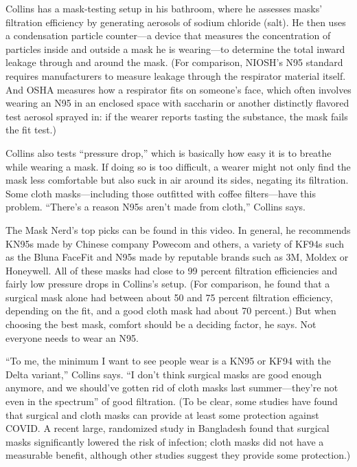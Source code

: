 \documentclass[a4paper, 14pt]{extarticle}
\begin{document}
Collins has a mask-testing setup in his bathroom, where he assesses masks’ filtration efficiency by generating aerosols of sodium chloride (salt). He then uses a condensation particle counter—a device that measures the concentration of particles inside and outside a mask he is wearing—to determine the total inward leakage through and around the mask. (For comparison, NIOSH’s N95 standard requires manufacturers to measure leakage through the respirator material itself. And OSHA measures how a respirator fits on someone’s face, which often involves wearing an N95 in an enclosed space with saccharin or another distinctly flavored test aerosol sprayed in: if the wearer reports tasting the substance, the mask fails the fit test.)

Collins also tests “pressure drop,” which is basically how easy it is to breathe while wearing a mask. If doing so is too difficult, a wearer might not only find the mask less comfortable but also suck in air around its sides, negating its filtration. Some cloth masks—including those outfitted with coffee filters—have this problem. “There’s a reason N95s aren’t made from cloth,” Collins says.

The Mask Nerd’s top picks can be found in this video. In general, he recommends KN95s made by Chinese company Powecom and others, a variety of KF94s such as the Bluna FaceFit and N95s made by reputable brands such as 3M, Moldex or Honeywell. All of these masks had close to 99 percent filtration efficiencies and fairly low pressure drops in Collins’s setup. (For comparison, he found that a surgical mask alone had between about 50 and 75 percent filtration efficiency, depending on the fit, and a good cloth mask had about 70 percent.) But when choosing the best mask, comfort should be a deciding factor, he says. Not everyone needs to wear an N95.

“To me, the minimum I want to see people wear is a KN95 or KF94 with the Delta variant,” Collins says. “I don’t think surgical masks are good enough anymore, and we should’ve gotten rid of cloth masks last summer—they’re not even in the spectrum” of good filtration. (To be clear, some studies have found that surgical and cloth masks can provide at least some protection against COVID. A recent large, randomized study in Bangladesh found that surgical masks significantly lowered the risk of infection; cloth masks did not have a measurable benefit, although other studies suggest they provide some protection.)
\end{document}
